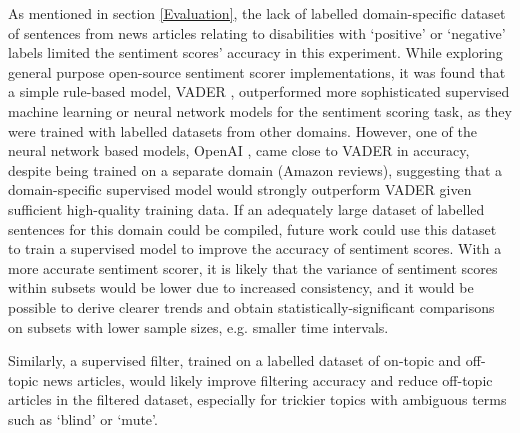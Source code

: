 \documentclass{report}
\begin{document}
As mentioned in section \ref{Evaluation}, the lack of labelled domain-specific dataset of sentences from news articles relating to disabilities with `positive' or `negative' labels limited the sentiment scores' accuracy in this experiment.
While exploring general purpose open-source sentiment scorer implementations, it was found that a simple rule-based model, VADER \cite{VADER}, outperformed more sophisticated supervised machine learning or neural network models for the sentiment scoring task, as they were trained with labelled datasets from other domains.
However, one of the neural network based models, OpenAI \cite{OpenAI}, came close to VADER in accuracy, despite being trained on a separate domain (Amazon reviews), suggesting that a domain-specific supervised model would strongly outperform VADER given sufficient high-quality training data.
If an adequately large dataset of labelled sentences for this domain could be compiled, future work could use this dataset to train a supervised model to improve the accuracy of sentiment scores.
With a more accurate sentiment scorer, it is likely that the variance of sentiment scores within subsets would be lower due to increased consistency, and it would be possible to derive clearer trends and obtain statistically-significant comparisons on subsets with lower sample sizes, e.g. smaller time intervals.

Similarly, a supervised filter, trained on a labelled dataset of on-topic and off-topic news articles, would likely improve filtering accuracy and reduce off-topic articles in the filtered dataset, especially for trickier topics with ambiguous terms such as `blind' or `mute'.
\end{document}
